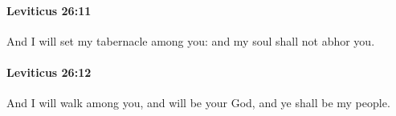 		\paragraph{Leviticus 26:11} %
			\label{LEVITICUS-26-11}

			And I will set my tabernacle among you: and my soul shall not abhor you.


		\paragraph{Leviticus 26:12} %
			\label{LEVITICUS-26-12}

			And I will walk among you, and will be your God, and ye shall be my people.


